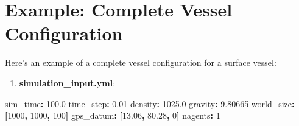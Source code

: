 \documentclass[
  letterpaper,
  DIV=11,
  numbers=noendperiod]{scrreprt}
\newenvironment{Shaded}{\begin{snugshade}}{\end{snugshade}}
\newcommand{\AttributeTok}[1]{\textcolor[rgb]{0.40,0.45,0.13}{#1}}
\newcommand{\DecValTok}[1]{\textcolor[rgb]{0.68,0.00,0.00}{#1}}
\newcommand{\FloatTok}[1]{\textcolor[rgb]{0.68,0.00,0.00}{#1}}
\newcommand{\FunctionTok}[1]{\textcolor[rgb]{0.28,0.35,0.67}{#1}}
\newcommand{\KeywordTok}[1]{\textcolor[rgb]{0.00,0.23,0.31}{\textbf{#1}}}
\providecommand{\tightlist}{%
  \setlength{\itemsep}{0pt}\setlength{\parskip}{0pt}}\usepackage{longtable,booktabs,array}
\begin{document}
\section*{Example: Complete Vessel
Configuration}\label{example-complete-vessel-configuration}


Here's an example of a complete vessel configuration for a surface
vessel:

\begin{enumerate}
\def\labelenumi{\arabic{enumi}.}
\tightlist
\item
  \textbf{simulation\_input.yml}:
\end{enumerate}

\begin{Shaded}
\begin{Highlighting}[]
\FunctionTok{sim\_time}\KeywordTok{:}\AttributeTok{ }\FloatTok{100.0}
\FunctionTok{time\_step}\KeywordTok{:}\AttributeTok{ }\FloatTok{0.01}
\FunctionTok{density}\KeywordTok{:}\AttributeTok{ }\FloatTok{1025.0}
\FunctionTok{gravity}\KeywordTok{:}\AttributeTok{ }\FloatTok{9.80665}
\FunctionTok{world\_size}\KeywordTok{:}\AttributeTok{ }\KeywordTok{[}\DecValTok{1000}\KeywordTok{,}\AttributeTok{ }\DecValTok{1000}\KeywordTok{,}\AttributeTok{ }\DecValTok{100}\KeywordTok{]}
\FunctionTok{gps\_datum}\KeywordTok{:}\AttributeTok{ }\KeywordTok{[}\FloatTok{13.06}\KeywordTok{,}\AttributeTok{ }\FloatTok{80.28}\KeywordTok{,}\AttributeTok{ }\DecValTok{0}\KeywordTok{]}
\FunctionTok{nagents}\KeywordTok{:}\AttributeTok{ }\DecValTok{1}


\end{Highlighting}
\end{Shaded}
\end{document}
